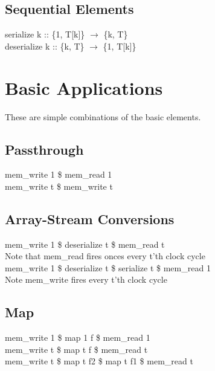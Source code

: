 \documentclass[11pt,fleqn]{article}
\numberwithin{equation}{subsection}
\begin{document}
\subsection{Sequential Elements}

\begin{adjustwidth}{2.5 em}{0 pt}
    serialize k :: \{1, T[k]\} $\rightarrow$ \{k, T\} \\
    deserialize k :: \{k, T\} $\rightarrow$ \{1, T[k]\}
\end{adjustwidth}

\section{Basic Applications}
These are simple combinations of the basic elements.

\subsection{Passthrough}
\begin{adjustwidth}{2.5 em}{0 pt}
    mem\_write 1 \$ mem\_read 1 \\
    mem\_write t \$ mem\_write t \\
\end{adjustwidth}

\subsection{Array-Stream Conversions}
\begin{adjustwidth}{2.5 em}{0 pt}
    mem\_write 1 \$ deserialize t \$ mem\_read t \\
        \null \qquad Note that mem\_read fires onces every t'th clock cycle \\
    mem\_write 1 \$ deserialize t \$ serialize t \$ mem\_read 1\\
        \null \qquad Note mem\_write fires every t'th clock cycle
\end{adjustwidth}

\subsection{Map}
\begin{adjustwidth}{2.5 em}{0 pt}
    mem\_write 1 \$ map 1 f \$ mem\_read 1 \\
    mem\_write t \$ map t f \$ mem\_read t \\
    mem\_write t \$ map t f2 \$ map t f1 \$ mem\_read t \\
\end{adjustwidth}
\end{document}
